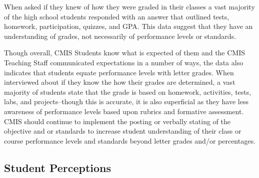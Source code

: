 \begin{findings}

When asked if they knew of how they were graded in their classes a vast majority of the high school students responded with an answer that outlined tests, homework, participation, quizzes, and GPA. This data suggest that they have an understanding of grades, not necessarily of performance levels or standards. 


Though overall, CMIS Students know what is expected of them and the CMIS Teaching Staff communicated expectations in a number of ways, the data also indicates that students equate performance levels with letter grades. When interviewed about if they know the how their grades are determined, a vast majority of students state that the grade is based on homework, activities, tests, labs, and projects--though this is accurate, it is also superficial as they have less awareness of performance levels based upon rubrics and formative assessment. CMIS should continue to implement the posting or verbally stating of the objective and or standards to increase student understanding of their class or course performance levels and standards beyond letter grades and/or percentages. 
\end{findings}

\subsection{Student Perceptions }



